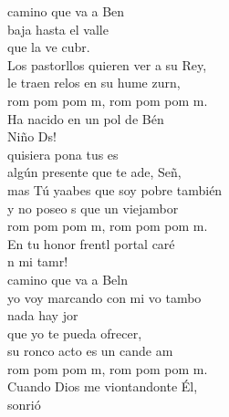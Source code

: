 \begin{cancion}[El tamborilero][]%
	 camino que va a Ben \\
baja hasta el valle \\
	que la ve cubr. \\
	Los pastorllos quieren ver a su Rey,\\
	le traen relos en su hume zurn,\\
	rom pom pom m, rom pom pom m.\\
	Ha nacido en un pol de Bén\\
	 Niño Ds!\\
\jump
	 quisiera pona tus es\\
	algún presente que te ade, Señ, \\
	mas Tú yaabes que soy pobre también\\
	y no poseo s que un viejambor\\
	rom pom pom m, rom pom pom m.\\
	En tu honor frentl portal caré\\
	n mi tamr!\\
\jump
	 camino que va a Beln\\
	yo voy marcando con mi vo tambo\\
	nada hay jor \\
que yo te pueda ofrecer,\\
	su ronco acto es un cande am\\
	rom pom pom m, rom pom pom m.\\
	Cuando Dios me viontandonte Él,\\
	 sonrió\\
\end{cancion}%
